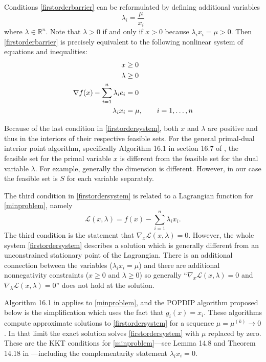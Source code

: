 \documentclass[11pt]{article}
\newcommand{\RR}{\mathbb{R}}
\newcommand{\grad}{\nabla}
\begin{document}
Conditions \eqref{firstorderbarrier} can be reformulated by defining additional variables
    $$\lambda_i = \frac{\mu}{x_i}$$
where $\lambda\in\RR^n$.  Note that $\lambda>0$ if and only if $x>0$ because $\lambda_i x_i = \mu > 0$.  Then \eqref{firstorderbarrier} is precisely equivalent to the following nonlinear system of equations and inequalities:
\begin{align}
x &\ge 0 \label{firstordersystem} \\
\lambda &\ge 0 \notag \\
\grad f(x) - \sum_{i=1}^n \lambda_i e_i &= 0 \notag \\
\lambda_i x_i &= \mu, \qquad i=1,\dots,n \notag
\end{align}

Because of the last condition in \eqref{firstordersystem}, both $x$ and $\lambda$ are positive and thus in the interiors of their respective feasible sets.  For the general primal-dual interior point algorithm, specifically Algorithm 16.1 in section 16.7 of \cite{GrivaNashSofer2009}, the feasible set for the primal variable $x$ is different from the feasible set for the dual variable $\lambda$.  For example, generally the dimension is different.  However, in our case the feasible set is $S$ for each variable separately.

The third condition in \eqref{firstordersystem} is related to a Lagrangian function for \eqref{minproblem}, namely
    $$\mathcal{L}(x,\lambda) = f(x) - \sum_{i=1}^n \lambda_i x_i.$$
The third condition is the statement that $\grad_x \mathcal{L}(x,\lambda)=0$.  However, the whole system \eqref{firstordersystem} describes a solution which is generally different from an unconstrained stationary point of the Lagrangian.  There is an additional connection between the variables ($\lambda_i x_i = \mu$) and there are additional nonnegativity constraints ($x\ge 0$ and $\lambda\ge 0$) so generally ``$\grad_x\mathcal{L}(x,\lambda)=0$ and $\grad_\lambda\mathcal{L}(x,\lambda)=0$'' does not hold at the solution.

Algorithm 16.1 in \cite{GrivaNashSofer2009} applies to \eqref{minproblem}, and the POPDIP algorithm proposed below is the simplification which uses the fact that $g_i(x)=x_i$.  These algorithms compute approximate solutions to \eqref{firstordersystem} for a sequence $\mu=\mu^{(k)} \to 0$.  In that limit the exact solution solves \eqref{firstordersystem} with $\mu$ replaced by zero.  These are the KKT conditions for \eqref{minproblem}---see Lemma 14.8 and Theorem 14.18 in \cite{GrivaNashSofer2009}---including the complementarity statement $\lambda_i x_i=0$.
\end{document}
